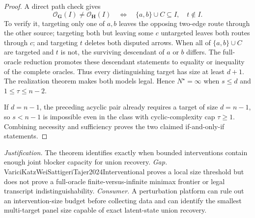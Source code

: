 \documentclass{article}
\begin{document}
\begin{proof}
A direct path check gives
\[
 \mathcal O_{\mathbf G}(I)\ne\mathcal O_{\mathbf H}(I)
 \quad\Longleftrightarrow\quad
 \{a,b\}\cup C\subseteq I,
 \quad t\notin I.
\]
To verify it, targeting only one of \(a,b\) leaves the opposing two-edge route through the other source; targeting both but leaving some \(c\) untargeted leaves both routes through \(c\); and targeting \(t\) deletes both disputed arrows. When all of \(\{a,b\}\cup C\) are targeted and \(t\) is not, the surviving descendant of \(a\) or \(b\) differs. The full-oracle reduction promotes these descendant statements to equality or inequality of the complete oracles. Thus every distinguishing target has size at least \(d+1\). The realization theorem makes both models legal. Hence \(N^{\star}=\infty\) when \(s\le d\) and \(1\le\tau\le n-2\).

If \(d=n-1\), the preceding acyclic pair already requires a target of size \(d=n-1\), so \(s<n-1\) is impossible even in the class with cyclic-complexity cap \(\tau\ge1\). Combining necessity and sufficiency proves the two claimed if-and-only-if statements.
\end{proof}
\par\smallskip\noindent \textit{Justification.} The theorem identifies exactly when bounded interventions contain enough joint blocker capacity for union recovery. \textit{Gap.} VariciKatzWeiSattigeriTajer2024Interventional proves a local size threshold but does not prove a full-oracle finite-versus-infinite minimax frontier or legal transcript indistinguishability. \textit{Consumer.} A perturbation platform can rule out an intervention-size budget before collecting data and can identify the smallest multi-target panel size capable of exact latent-state union recovery.
\end{document}
